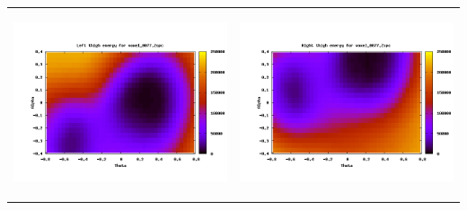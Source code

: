 \documentclass[12pt,a4paper]{article}
\begin{document}
\newpage

\begin{tabular}{p{9cm} p{9cm}}
	\begin{center}\includegraphics[width=9cm]{badalpha-leftthigh.png}\end{center}&
	\begin{center}\includegraphics[width=9cm]{badalpha-rightthigh.png}\end{center}\\
	

\end{tabular}
\end{document}
